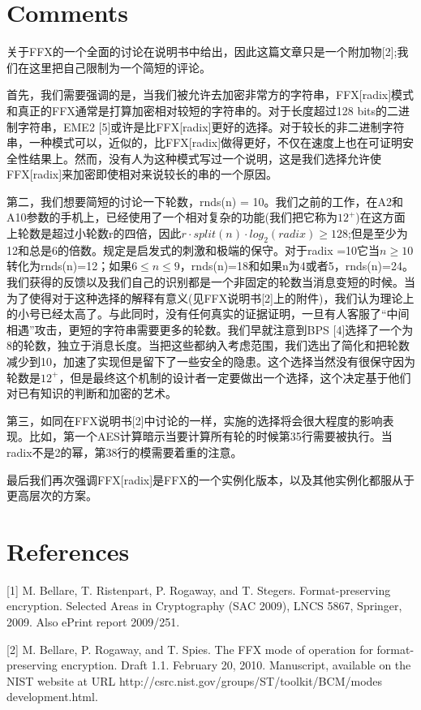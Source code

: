 \section{Comments}
关于FFX的一个全面的讨论在说明书中给出，因此这篇文章只是一个附加物[2];我们在这里把自己限制为一个简短的评论。

首先，我们需要强调的是，当我们被允许去加密非常方的字符串，FFX[radix]模式和真正的FFX通常是打算加密相对较短的字符串的。对于长度超过128 bits的二进制字符串，EME2 [5]或许是比FFX[radix]更好的选择。对于较长的非二进制字符串，一种模式可以，近似的，比FFX[radix]做得更好，不仅在速度上也在可证明安全性结果上。然而，没有人为这种模式写过一个说明，这是我们选择允许使FFX[radix]来加密即使相对来说较长的串的一个原因。

第二，我们想要简短的讨论一下轮数，rnds(n) = 10。我们之前的工作，在A2和A10参数的手机上，已经使用了一个相对复杂的功能(我们把它称为$12^+$)在这方面上轮数是超过小轮数r的四倍，因此$r \cdot split(n) \cdot log_2(radix) \geq 128$;但是至少为12和总是6的倍数。规定是启发式的刺激和极端的保守。对于radix =10它当$n \geq 10$转化为rnds(n)=12；如果$6 \leq n \leq 9$，rnds(n)=18和如果n为4或者5，rnds(n)=24。我们获得的反馈以及我们自己的识别都是一个非固定的轮数当消息变短的时候。当为了使得对于这种选择的解释有意义(见FFX说明书[2]上的附件)，我们认为理论上的小号已经太高了。与此同时，没有任何真实的证据证明，一旦有人客服了“中间相遇”攻击，更短的字符串需要更多的轮数。我们早就注意到BPS [4]选择了一个为8的轮数，独立于消息长度。当把这些都纳入考虑范围，我们选出了简化和把轮数减少到10，加速了实现但是留下了一些安全的隐患。这个选择当然没有很保守因为轮数是$12^+$，但是最终这个机制的设计者一定要做出一个选择，这个决定基于他们对已有知识的判断和加密的艺术。

第三，如同在FFX说明书[2]中讨论的一样，实施的选择将会很大程度的影响表现。比如，第一个AES计算暗示当要计算所有轮的时候第35行需要被执行。当radix不是2的幂，第38行的模需要着重的注意。

最后我们再次强调FFX[radix]是FFX的一个实例化版本，以及其他实例化都服从于更高层次的方案。

\section{References}
[1] M. Bellare, T. Ristenpart, P. Rogaway, and T. Stegers. Format-preserving encryption. Selected Areas in Cryptography (SAC 2009), LNCS 5867, Springer, 2009. Also ePrint report 2009/251.

[2] M. Bellare, P. Rogaway, and T. Spies. The FFX mode of operation for format-preserving encryption. Draft 1.1. February 20, 2010. Manuscript, available on the NIST website at URL http://csrc.nist.gov/groups/ST/toolkit/BCM/modes development.html.

